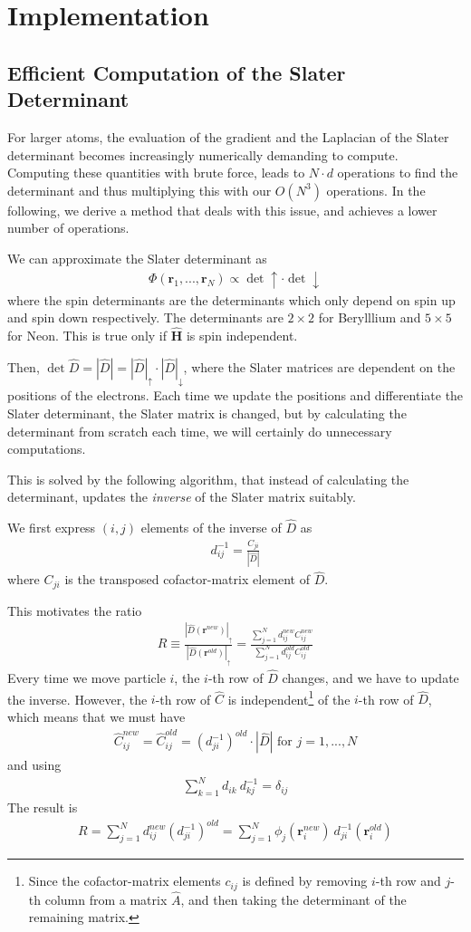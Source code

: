 \documentclass[twocolumns, a4paper,11pt,fleqn]{extarticle}
\newcommand{\eq}[1]{{\small\begin{align*}#1\end{align*}}}
\renewcommand\vec[1]{\boldsymbol{\mathbf{#1}}}
\newcommand{\OP}[1]{\mathbf{\widehat{#1}}}
\newcommand{\op}[1]{\hat{#1}}
\begin{document}
\clearpage

\section{Implementation}
\subsection{Efficient Computation of the Slater Determinant}

For larger atoms, the evaluation of the gradient and the Laplacian of the Slater
determinant becomes increasingly numerically demanding
to compute. Computing these quantities with brute force, 
leads to $N\cdot d$ operations to find the determinant and thus
multiplying this with our $O(N^3)$ operations.
In the following, we derive a method that deals with this issue, 
and achieves a lower number of operations.

We can approximate the Slater determinant as
\eq{
	\Phi(\vec r_1, ..., \vec r_N) \propto \det\uparrow\cdot\det\downarrow
}
where the spin determinants are the determinants which only depend on spin up and spin down
respectively. The determinants are $2\times 2$ for Berylllium and $5\times 5$ for Neon.
This is true only if $\OP H$ is spin independent.

Then, $\det \op D = |\op D| = |\op D|_{\uparrow}\cdot |\op D|_{\downarrow}$, 
where the Slater matrices are dependent on the positions of the electrons. 
Each time we update the positions and differentiate the Slater determinant,
the Slater matrix is changed, but by calculating the determinant 
from scratch each time, we will certainly do unnecessary computations. 

This is solved by the following algorithm, that instead of calculating 
the determinant, updates the \textit{inverse} of the Slater matrix suitably.

We first express $(i,j)$ elements of the inverse of $\op D$ as
\eq{
  d_{ij}^{-1} = \frac{C_{ji}}{|\op D|}
}
where $C_{ji}$ is the transposed cofactor-matrix element of $\op D$.

This motivates the ratio
\eq{
  R \equiv \frac{|\op D(\vec r^{new})|_{\uparrow}}{|\op D(\vec r^{old})|_{\uparrow}} 
  = \frac{\sum_{j=1}^N d_{ij}^{new} C_{ij}^{new}}
    {\sum_{j=1}^N d_{ij}^{old} C_{ij}^{old}}
}
Every time we move particle $i$, the $i$-th row of $\op D$ changes,
and we have to update the inverse. However, the $i$-th row of $\op C$
is independent\footnote{Since the cofactor-matrix elements $c_{ij}$ is defined by 
removing $i$-th row and $j$-th column from a matrix $\op A$,
and then taking the determinant of the remaining matrix.} 
of the $i$-th row of $\op D$, which means that
we must have
\eq{
  \op C_{ij}^{new} = \op C_{ij}^{old} = (d_{ji}^{-1})^{old}\cdot |\op D| 
    \text{ for } j=1,...,N
}
and using
\eq{
  \sum_{k=1}^N d_{ik}\ d_{kj}^{-1} =\delta_{ij}
}
The result is
\eq{
  R=\sum_{j=1}^N d_{ij}^{new} (d_{ji}^{-1})^{old}
    =\sum_{j=1}^N \phi_j(\vec r_i^{new})\ d_{ji}^{-1} (\vec r_i^{old})
}
\end{document}
